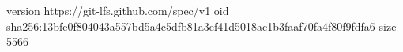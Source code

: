 version https://git-lfs.github.com/spec/v1
oid sha256:13bfe0f804043a557bd5a4c5dfb81a3ef41d5018ac1b3faaf70fa4f80f9fdfa6
size 5566
